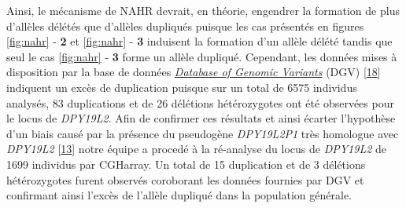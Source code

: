 \documentclass[12pt,twoside]{reedthesis}
\theoremstyle{definition}
\theoremstyle{definition}
\theoremstyle{remark}
\begin{document}
  Ainsi, le mécanisme de NAHR devrait, en théorie, engendrer la formation
  de plus d'allèles délétés que d'allèles dupliqués puisque les cas
  présentés en figures \ref{fig:nahr} - \textbf{2} et \ref{fig:nahr} -
  \textbf{3} induisent la formation d'un allèle délété tandis que seul le
  cas \ref{fig:nahr} - \textbf{3} forme un allèle dupliqué. Cependant, les
  données mises à disposition par la base de données
  \href{http://dgv.tcag.ca/dgv/app/home}{\emph{Database of Genomic
  Variants}} (DGV) {[}\protect\hyperlink{ref-MacDonald2014}{18}{]}
  indiquent un excès de duplication puisque sur un total de 6575 individus
  analysés, 83 duplications et de 26 délétions hétérozygotes ont été
  observées pour le locus de \emph{DPY19L2}. Afin de confirmer ces
  résultats et ainsi écarter l'hypothèse d'un biais causé par la présence
  du pseudogène \emph{DPY19L2P1} très homologue avec \emph{DPY19L2}
  {[}\protect\hyperlink{ref-Carson2006}{13}{]} notre équipe a procedé à la
  ré-analyse du locus de \emph{DPY19L2} de 1699 individus par CGHarray. Un
  total de 15 duplication et de 3 délétions hétérozygotes furent observés
  coroborant les données fournies par DGV et confirmant ainsi l'excès de
  l'allèle dupliqué dans la population générale.
  
  \newpage
  
\end{document}
